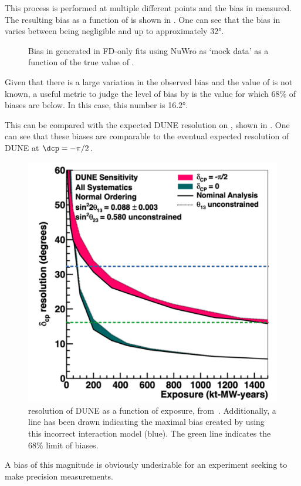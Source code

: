 This process is performed at multiple different \dcp points and the bias in \dcp measured. 
The resulting bias as a function of \dcpTrue is shown in .
One can see that the bias in \dcp varies between being negligible and up to approximately \ang{32}. 

\begin{figure}[h]
	\begin{adjustbox}{max totalsize=.6\linewidth, center}
		
	\end{adjustbox}
	\caption[Example of \dcp bias in FD-only fits using NuWro data]{Bias in \dcp generated in FD-only fits using NuWro as `mock data' as a function of the true value of \dcp.}
	\label{fig:dcpBiasNoWgt}
\end{figure}

Given that there is a large variation in the observed bias and the value of \dcp is not known, a useful metric to judge the level of bias by is the value for which 68\% of biases are below.
In this case, this number is \ang{16.2}.

This can be compared with the expected DUNE resolution on \dcp, shown in . 
One can see that these biases are comparable to the eventual expected \dcp resolution of DUNE at $\dcp = -\pi/2$.
\begin{figure}[h]
	\centering
	\includegraphics[width=.5\linewidth]{files/figures/dune_ndrwt/dcpResWithLines-cropped}
	\caption[\dcp resolution of DUNE as a function of exposure]{\dcp resolution of DUNE as a function of exposure, from~\cite{Abi:2020qib}. Additionally, a line has been drawn indicating the maximal \dcp bias created by using this incorrect interaction model (blue). The green line indicates the 68\% limit of \dcp biases.}
	\label{fig:dcpResDUNE}
\end{figure}
A bias of this magnitude is obviously undesirable for an experiment seeking to make precision measurements.


